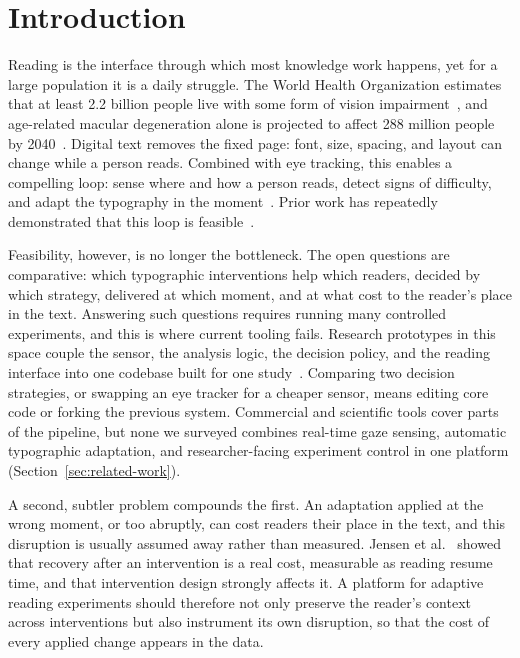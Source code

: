 \section{Introduction}
\label{sec:introduction}

Reading is the interface through which most knowledge work happens, yet for a large population it is a daily struggle.
The World Health Organization estimates that at least 2.2 billion people live with some form of vision impairment~\cite{who2026vision}, and age-related macular degeneration alone is projected to affect 288 million people by 2040~\cite{apte2021amd}.
Digital text removes the fixed page: font, size, spacing, and layout can change while a person reads.
Combined with eye tracking, this enables a compelling loop: sense where and how a person reads, detect signs of difficulty, and adapt the typography in the moment~\cite{dtucompute2025rtr}.
Prior work has repeatedly demonstrated that this loop is feasible~\cite{beymer2008eyetracking, dmello2012gazetutor, hutt2020eyemind, jensen2025context}.

Feasibility, however, is no longer the bottleneck.
The open questions are comparative: which typographic interventions help which readers, decided by which strategy, delivered at which moment, and at what cost to the reader's place in the text.
Answering such questions requires running many controlled experiments, and this is where current tooling fails.
Research prototypes in this space couple the sensor, the analysis logic, the decision policy, and the reading interface into one codebase built for one study~\cite{refsgaard2024rtr, pereira2024typography, palinec2024reactive}.
Comparing two decision strategies, or swapping an eye tracker for a cheaper sensor, means editing core code or forking the previous system.
Commercial and scientific tools cover parts of the pipeline, but none we surveyed combines real-time gaze sensing, automatic typographic adaptation, and researcher-facing experiment control in one platform (Section~\ref{sec:related-work}).

A second, subtler problem compounds the first.
An adaptation applied at the wrong moment, or too abruptly, can cost readers their place in the text, and this disruption is usually assumed away rather than measured.
Jensen et al.~\cite{jensen2025context} showed that recovery after an intervention is a real cost, measurable as reading resume time, and that intervention design strongly affects it.
A platform for adaptive reading experiments should therefore not only preserve the reader's context across interventions but also instrument its own disruption, so that the cost of every applied change appears in the data.

